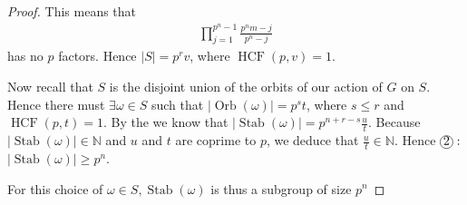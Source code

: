 \documentclass{article}
\newcommand*\circled[1]{\tikz[baseline=(char.base)]{
    \node[shape=circle, draw, inner sep=0.1pt, 
        minimum height=5pt] (char) {\vphantom{1g}#1};}}
\newcommand{\Stab}{\operatorname{Stab}}
\newcommand{\Orb}{\operatorname{Orb}}
\newcommand{\HCF}{\operatorname{HCF}}
\begin{document}
\begin{proof}
This means that
\begin{align*}
\prod_{j=1}^{p^{n}-1} \frac{p^{n} m-j}{p^{n}-j}
\end{align*}
has no $p$ factors. Hence $|S|=p^{r} v$, where $\HCF(p, v)=1$.

Now recall that $S$ is the disjoint union of the orbits of our action of $G$ on $S$. Hence there must $\exists\omega \in S$ such that $|\Orb(\omega)|=p^{s} t$, where $s \leq r$ and $\HCF(p, t)=1$. By the  we know that $|\Stab(\omega)|=p^{n+r-s} \frac{u}{t} .$ Because $|\operatorname{Stab}(\omega)| \in \mathbb{N}$ and $u$ and $t$ are coprime to $p$, we deduce that $\frac{u}{t} \in \mathbb{N}$. Hence $\circled{2}:$ $|\operatorname{Stab}(\omega)| \geq p^{n}$.

For this choice of $\omega \in S, \operatorname{Stab}(\omega)$ is thus a subgroup of size $p^{n}$
\end{proof} 
\end{document}
